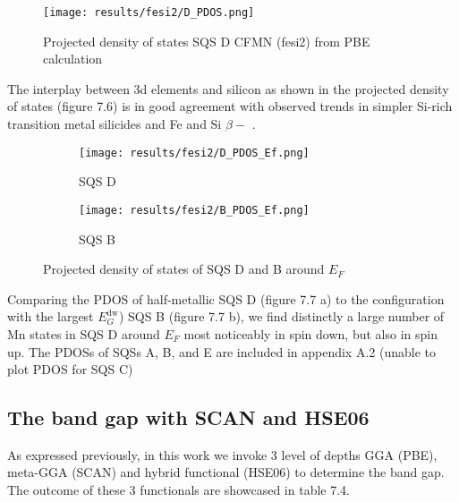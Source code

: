 \begin{figure}[H]
	\centering
	\texttt{[image: results/fesi2/D\_PDOS.png]}
	\caption{Projected density of states SQS D CFMN (fesi2) from PBE calculation}
\end{figure} 

The interplay between 3d elements and silicon as shown in the projected density of states (figure 7.6) is in good agreement with observed trends in simpler Si-rich transition metal silicides \cite{lange1997electronic} and Fe and Si $\beta-$  \cite{doi:10.1063/1.346415}.
\begin{figure}[H]
	\begin{subfigure}{.5\textwidth}
			\texttt{[image: results/fesi2/D\_PDOS\_Ef.png]}
			\caption{SQS D}		
	\end{subfigure}
	\begin{subfigure}{.5\textwidth}
		\texttt{[image: results/fesi2/B\_PDOS\_Ef.png]}
		\caption{SQS B}		
	\end{subfigure}
	\caption{Projected density of states of SQS D and B around $E_F$}
\end{figure}

Comparing the PDOS of half-metallic SQS D (figure 7.7 a) to the configuration with the largest $E_G ^\text{dw}$) SQS B (figure 7.7 b), we find distinctly a large number of Mn states in SQS D around $E_F$ most noticeably in spin down, but also in spin up. The PDOSs of SQSs A, B, and E are included in appendix A.2 (unable to plot PDOS for SQS C)

\subsection{The band gap with SCAN and HSE06}
As expressed previously, in this work we invoke 3 level of depths GGA (PBE), meta-GGA (SCAN) and hybrid functional (HSE06) to determine the band gap. The outcome of these 3 functionals are showcased in table 7.4.

